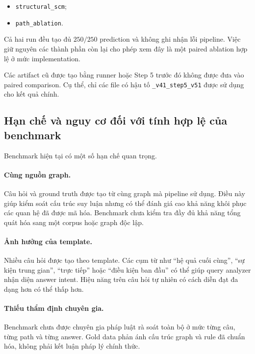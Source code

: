 \begin{itemize}
    \item \texttt{structural\_scm};
    \item \texttt{path\_ablation}.
\end{itemize}

Cả hai run đều tạo đủ \(250/250\) prediction và không ghi nhận lỗi pipeline.
Việc giữ nguyên các thành phần còn lại cho phép xem đây là một paired
ablation hợp lệ ở mức implementation.

Các artifact cũ được tạo bằng runner hoặc Step 5 trước đó không được đưa vào
paired comparison. Cụ thể, chỉ các file có hậu tố
\texttt{\_v41\_step5\_v51} được sử dụng cho kết quả chính.

\subsection{Hạn chế và nguy cơ đối với tính hợp lệ của benchmark}

Benchmark hiện tại có một số hạn chế quan trọng.

\paragraph{Cùng nguồn graph.}

Câu hỏi và ground truth được tạo từ cùng graph mà pipeline sử dụng. Điều này
giúp kiểm soát cấu trúc suy luận nhưng có thể đánh giá cao khả năng khôi
phục các quan hệ đã được mã hóa. Benchmark chưa kiểm tra đầy đủ khả năng tổng
quát hóa sang một corpus hoặc graph độc lập.

\paragraph{Ảnh hưởng của template.}

Nhiều câu hỏi được tạo theo template. Các cụm từ như ``hệ quả cuối cùng'',
``sự kiện trung gian'', ``trực tiếp'' hoặc ``điều kiện ban đầu'' có thể giúp
query analyzer nhận diện answer intent. Hiệu năng trên câu hỏi tự nhiên có
cách diễn đạt đa dạng hơn có thể thấp hơn.

\paragraph{Thiếu thẩm định chuyên gia.}

Benchmark chưa được chuyên gia pháp luật rà soát toàn bộ ở mức từng câu,
từng path và từng answer. Gold data phản ánh cấu trúc graph và rule đã chuẩn
hóa, không phải kết luận pháp lý chính thức.

